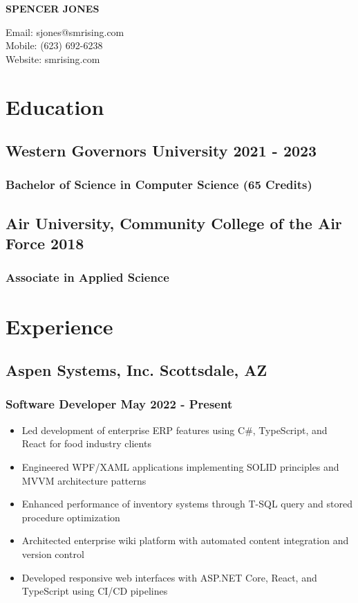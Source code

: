 \documentclass[11pt]{article} %
\begin{document}
\begin{center}
	\begin{minipage}{0.55\textwidth}
		{\Huge\bfseries SPENCER JONES}
	\end{minipage}
	\begin{minipage}{0.4\textwidth}
		\raggedleft
		Email: sjones@smrising.com \\
		Mobile: (623) 692-6238 \\
        Website: smrising.com \\
	\end{minipage} \hfill
\end{center}

\section{Education}
\subsection{Western Governors University \hfill 2021 - 2023}
\subsubsection{Bachelor of Science in Computer Science (65 Credits)}
\subsection{Air University, Community College of the Air Force \hfill 2018} 
\subsubsection{Associate in Applied Science}
\vspace{0.7em}
\section{Experience}

\subsection*{Aspen Systems, Inc. \hfill Scottsdale, AZ}
\subsubsection{Software Developer \hfill May 2022 - Present}
\begin{itemize}
    \item Led development of enterprise ERP features using C\#, TypeScript, and React for food industry clients
    \item Engineered WPF/XAML applications implementing SOLID principles and MVVM architecture patterns
    \item Enhanced performance of inventory systems through T-SQL query and stored procedure optimization
    \item Architected enterprise wiki platform with automated content integration and version control
    \item Developed responsive web interfaces with ASP.NET Core, React, and TypeScript using CI/CD pipelines
\end{itemize}
\end{document}
